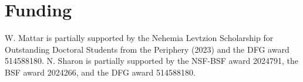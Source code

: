 \documentclass[12pt]{amsart}
\begin{document}




\section*{Funding}

W. Mattar is partially supported by the Nehemia Levtzion Scholarship for Outstanding Doctoral Students from the Periphery (2023) and the DFG award 514588180. N. Sharon is partially supported by the NSF-BSF award 2024791, the BSF award 2024266, and the DFG award 514588180.
\end{document}
